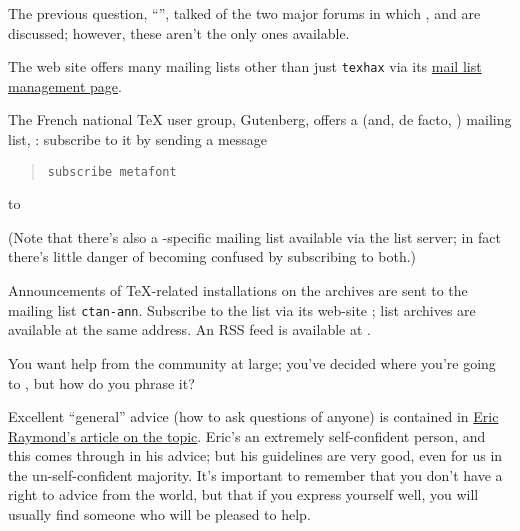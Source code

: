 
The previous question, ``'', talked of
the two major forums in which \AllTeX{}, \MF{} and \MP{} are
discussed; however, these aren't the only ones available.

The  web site offers many mailing lists other than just
\texttt{texhax} via its %
\href{http://tug.org/mailman/listinfo}{mail list management page}.

The French national \TeX{} user group, Gutenberg, offers a \MF{} (and,
de facto, \MP{}) mailing list, : subscribe to
it by sending a message
\begin{quote}
\begin{verbatim}
subscribe metafont
\end{verbatim}
\end{quote}
to 

(Note that there's also a \MP{}-specific mailing list available via the
 list server; in fact there's little danger of becoming confused
by subscribing to both.)

Announcements of \TeX{}-related installations on the 
archives are sent to the mailing list \texttt{ctan-ann}.  Subscribe
to the list via its  web-site
; list archives
are available at the same address.  An RSS feed is available at
.


You want help from the community at large; you've decided where you're
going to , but how do you
phrase it?

Excellent ``general'' advice (how to ask questions of anyone) is
contained in
\href{http://catb.org/~esr/faqs/smart-questions.html}{Eric Raymond's article on the topic}.
Eric's an extremely self-confident person, and this comes through in
his advice; but his guidelines are very good, even for us in the
un-self-confident majority.  It's important to remember that you don't
have a right to advice from the world, but that if you express
yourself well, you will usually find someone who will be pleased to
help.


